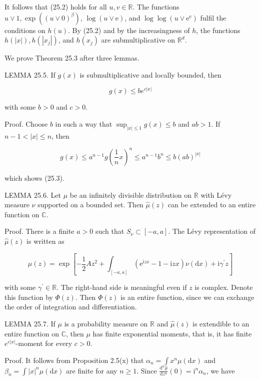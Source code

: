 \documentclass[a4paper,12pt]{article}
\begin{document}
It follows that (25.2) holds for all $u, v \in \mathbb{R}$. The functions $u \vee 1, \exp \left((u \vee 0)^{\beta}\right)$, $\log (u \vee \mathrm{e})$, and $\log \log \left(u \vee \mathrm{e}^{\mathrm{e}}\right)$ fulfil the conditions on $h(u)$. By (25.2) and by the increasingness of $h$, the functions $h(|x|), h\left(\left|x_{j}\right|\right)$, and $h\left(x_{j}\right)$ are submultiplicative on $\mathbb{R}^{d}$.

We prove Theorem 25.3 after three lemmas.

LEMMA 25.5. If $g(x)$ is submultiplicative and locally bounded, then


\begin{equation*}
    g(x) \leq b e^{c|x|} \tag{25.3}
\end{equation*}


with some $b>0$ and $c>0$.

Proof. Choose $b$ in such a way that $\sup _{|x| \leq 1} g(x) \leq b$ and $a b>1$. If $n-1<|x| \leq n$, then

$$
    g(x) \leq a^{n-1} g\left(\frac{1}{n} x\right)^{n} \leq a^{n-1} b^{n} \leq b(a b)^{|x|}
$$

which shows (25.3).

LEMMA 25.6. Let $\mu$ be an infinitely divisible distribution on $\mathbb{R}$ with Lévy measure $\nu$ supported on a bounded set. Then $\widehat{\mu}(z)$ can be extended to an entire function on $\mathbb{C}$.

Proof. There is a finite $a>0$ such that $S_{\nu} \subset[-a, a]$. The Lévy representation of $\widehat{\mu}(z)$ is written as

$$
    \widehat{\mu}(z)=\exp \left[-\frac{1}{2} A z^{2}+\int_{[-a, a]}\left(\mathrm{e}^{\mathrm{i} z x}-1-\mathrm{i} z x\right) \nu(\mathrm{d} x)+\mathrm{i} \gamma^{\prime} z\right]
$$

with some $\gamma^{\prime} \in \mathbb{R}$. The right-hand side is meaningful even if $z$ is complex. Denote this function by $\Phi(z)$. Then $\Phi(z)$ is an entire function, since we can exchange the order of integration and differentiation.

LEMMA 25.7. If $\mu$ is a probability measure on $\mathbb{R}$ and $\widehat{\mu}(z)$ is extendible to an entire function on $\mathbb{C}$, then $\mu$ has finite exponential moments, that is, it has finite $e^{c|x|}$-moment for every $c>0$.

Proof. It follows from Proposition 2.5(x) that $\alpha_{n}=\int x^{n} \mu(\mathrm{d} x)$ and $\beta_{n}=\int|x|^{n} \mu(\mathrm{d} x)$ are finite for any $n \geq 1$. Since $\frac{\mathrm{d}^{n} \widehat{\mu}}{\mathrm{d} z^{n}}(0)=\mathrm{i}^{n} \alpha_{n}$, we have
\end{document}
